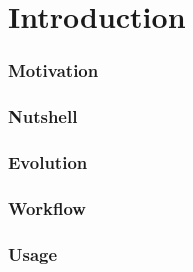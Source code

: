 \part{Introduction}
\section{Motivation}

\section{Nutshell}

\section{Evolution}

\section{Workflow}

\section{Usage}

%
